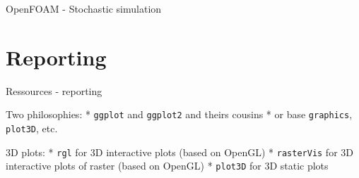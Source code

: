 \documentclass[8pt,ignorenonframetext,]{beamer}
\providecommand{\tightlist}{%
  \setlength{\itemsep}{0pt}\setlength{\parskip}{0pt}}
\newcommand{\columnsend}{\end{columns}}
\begin{document}

\begin{frame}{OpenFOAM - Stochastic simulation}

\end{frame}

\section{Reporting}\label{reporting}

\begin{frame}[fragile]{Ressources - reporting}

Two philosophies: * \texttt{ggplot} and \texttt{ggplot2} and theirs
cousins * or base \texttt{graphics}, \texttt{plot3D}, etc.

3D plots: * \texttt{rgl} for 3D interactive plots (based on OpenGL) *
\texttt{rasterVis} for 3D interactive plots of raster (based on OpenGL)
* \texttt{plot3D} for 3D static plots

\end{frame}
\end{document}
